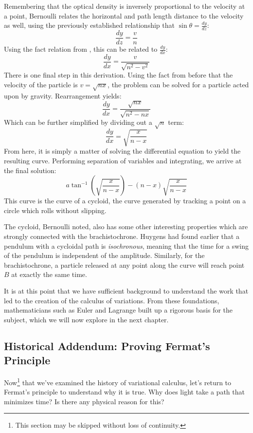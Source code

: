 Remembering that the optical density is inversely proportional to the velocity at a point, Bernoulli relates the horizontal and path length distance to the velocity as well, using the previously established relationship that $\sin\theta=\frac{dy}{dz}$:
$$\frac{dy}{dz}=\frac{v}{n}$$
Using the fact relation from , this can be related to $\frac{dy}{dx}$:
$$\frac{dy}{dx}=\frac{v}{\sqrt{n^2-v^2}}$$
There is one final step in this derivation. Using the fact from before that the velocity of the particle is $v=\sqrt{nx}$, the problem can be solved for a particle acted upon by gravity. Rearrangement yields:
\begin{equation}
\frac{dy}{dx}=\frac{\sqrt{nx}}{\sqrt{n^2-nx}}
\end{equation}
Which can be further simplified by dividing out a $\sqrt{n}$ term:
\begin{equation}
        \frac{dy}{dx}=\sqrt{\frac{x}{n-x}}
\end{equation}
From here, it is simply a matter of solving the differential equation to yield the resulting curve. Performing separation of variables and integrating, we arrive at the final solution:
$$a\tan^{-1}\left(\sqrt{\frac{x}{n-x}}\right)-(n-x)\sqrt{\frac{x}{n-x}}$$
This curve is the curve of a cycloid, the curve generated by tracking a point on a circle which rolls without slipping.

The cycloid, Bernoulli noted, also has some other interesting properties which are strongly connected with the \gls{brachistochrone}. Huygens had found earlier that a pendulum with a cycloidal path is \textit{isochronous}, meaning that the time for a swing of the pendulum is independent of the amplitude. Similarly, for the \gls{brachistochrone}, a particle released at any point along the curve will reach point $B$ at exactly the same time.

It is at this point that we have sufficient background to understand the work that led to the creation of the calculus of variations. From these foundations, mathematicians such as Euler and Lagrange built up a rigorous basis for the subject, which we will now explore in the next chapter.

\subsection{Historical Addendum: Proving Fermat's Principle}\label{sec: connection to quantum}

Now\footnote{This section may be skipped without loss of continuity.} that we've examined the history of variational calculus, let's return to Fermat's principle to understand why it is true. Why does light take a path that minimizes time? Is there any physical reason for this?

